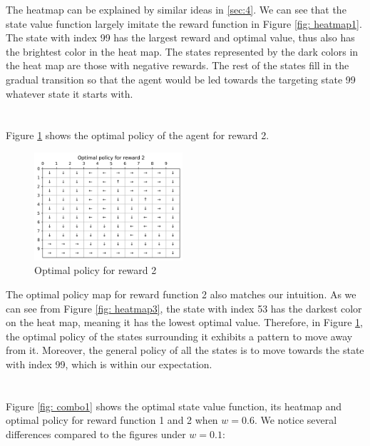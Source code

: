 The heatmap can be explained by similar ideas in \ref{sec:4}. We can see that the state value function largely imitate the reward function in Figure \ref{fig: heatmap1}. The state with index 99 has the largest reward and optimal value, thus also has the brightest color in the heat map. The states represented by the dark colors in the heat map are those with negative rewards. The rest of the states fill in the gradual transition so that the agent would be led towards the targeting state 99 whatever state it starts with.

\section{}\label{sec:8}
Figure \ref{fig: policy2} shows the optimal policy of the agent for reward 2.

\begin{figure}[!htb]
\centering
  \includegraphics[width=0.49\textwidth]{images/Q1-9/Optimal-policy-for-reward-2.png}
  \caption{Optimal policy for reward 2}
\label{fig: policy2}
\end{figure}

The optimal policy map for reward function 2 also matches our intuition. As we can see from
Figure \ref{fig: heatmap3}, the state with index 53 has the darkest color on the heat map, meaning it has the lowest optimal value. Therefore, in Figure \ref{fig: policy2}, the optimal policy of the states surrounding it exhibits a pattern to move away from it. Moreover, the general policy of all the states is to move towards the state with index 99, which is within our expectation.
\newpage

\section{}\label{sec:9}
Figure \ref{fig: combo1} shows the optimal state value function, its heatmap and optimal policy for reward function 1 and 2 when $w=0.6$. We notice several differences compared to the figures under $w=0.1$:

